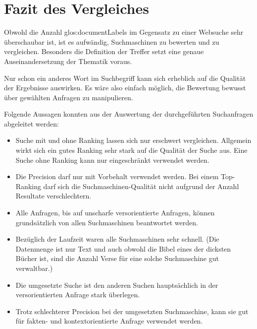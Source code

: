 \newpage
\section{Fazit des Vergleiches}
Obwohl die Anzahl \glspl{glos:documentLabel} im Gegensatz zu einer Websuche sehr überschaubar ist, ist es aufwändig, Suchmaschinen zu bewerten und zu vergleichen.
Besonders die Definition der Treffer setzt eine genaue Auseinandersetzung der Thematik voraus.

Nur schon ein anderes Wort im Suchbegriff kann sich erheblich auf die Qualität der Ergebnisse auswirken. Es wäre also einfach möglich, die Bewertung bewusst über gewählten Anfragen zu manipulieren.

Folgende Aussagen konnten aus der Auswertung der durchgeführten Suchanfragen abgeleitet werden:
\begin{itemize}[noitemsep]
	\item Suche mit und ohne Ranking lassen sich nur erschwert vergleichen. Allgemein wirkt sich ein gutes Ranking sehr stark auf die Qualität der Suche aus. Eine Suche ohne Ranking kann nur eingeschränkt verwendet werden.
	
	\item Die Precision darf nur mit Vorbehalt verwendet werden.
	Bei einem Top-Ranking darf sich die Suchmaschinen-Qualität nicht aufgrund der Anzahl Resultate verschlechtern.
	
	\item Alle Anfragen, bis auf unscharfe versorientierte Anfragen, können grundsätzlich von allen Suchmaschinen beantwortet werden.

	\item Bezüglich der Laufzeit waren alle Suchmaschinen sehr schnell. (Die Datenmenge ist nur Text und auch obwohl die Bibel eines der dicksten Bücher ist, sind die Anzahl Verse für eine solche Suchmaschine gut verwaltbar.)
	
	\item Die umgesetzte Suche ist den anderen Suchen hauptsächlich in der versorientierten Anfrage stark überlegen.
	
	\item Trotz schlechterer Precision bei der umgesetzten Suchmaschine, kann sie gut für fakten- und kontextorientierte Anfrage verwendet werden.

\end{itemize}



